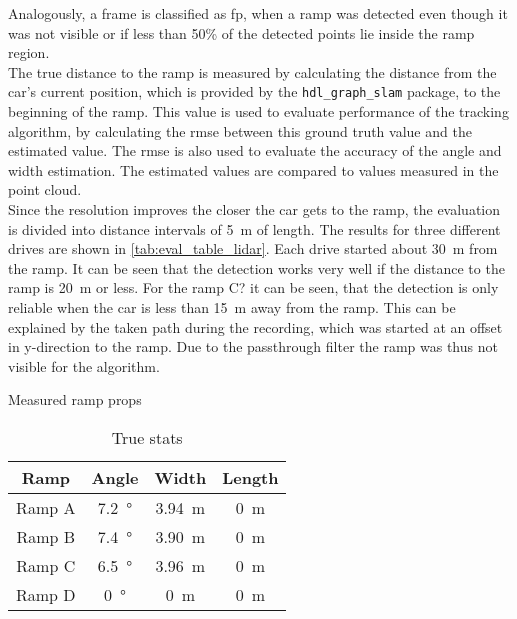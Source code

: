 Analogously, a frame is classified as \gls{fp}, when a ramp was detected even though it was not visible or if less than 50\% of the detected points lie inside the ramp region.\\
The true distance to the ramp is measured by calculating the distance from the car's current position, which is provided by the \texttt{hdl\_graph\_slam} package, to the beginning of the ramp.
This value is used to evaluate performance of the tracking algorithm, by calculating the \gls{rmse} between this ground truth value and the estimated value.
The \gls{rmse} is also used to evaluate the accuracy of the angle and width estimation.
The estimated values are compared to values measured in the point cloud.\\
Since the resolution improves the closer the car gets to the ramp, the evaluation is divided into distance intervals of \SI{5}{\metre} of length.
The results for three different drives are shown in \cref{tab:eval_table_lidar}.
Each drive started about \SI{30}{\metre} from the ramp.
It can be seen that the detection works very well if the distance to the ramp is \SI{20}{\metre} or less.
For the ramp C? it can be seen, that the detection is only reliable when the car is less than \SI{15}{\metre} away from the ramp.
This can be explained by the taken path during the recording, which was started at an offset in y-direction to the ramp.
Due to the passthrough filter the ramp was thus not visible for the algorithm.\\

Measured ramp props
\begin{table}
    \centering
    \caption{True stats}
    \label{tab:ramp_props}
    \begin{tabular}[t]{cccc}
        \toprule
        \textbf{Ramp} & \textbf{Angle}    & \textbf{Width}    & \textbf{Length} \\
        \midrule
        Ramp A        & \SI{7.2}{\degree} & \SI{3.94}{\metre} & \SI{0}{\metre}  \\
        Ramp B        & \SI{7.4}{\degree} & \SI{3.90}{\metre} & \SI{0}{\metre}  \\
        Ramp C        & \SI{6.5}{\degree} & \SI{3.96}{\metre} & \SI{0}{\metre}  \\
        Ramp D        & \SI{0}{\degree}   & \SI{0}{\metre}    & \SI{0}{\metre}  \\
        \bottomrule
    \end{tabular}
\end{table}

